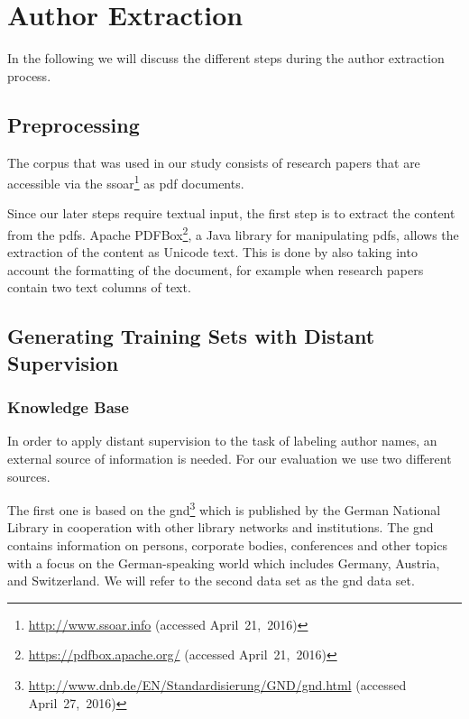 \chapter{Author Extraction}\label{cha:author-extraction}
In the following we will discuss the different steps during the author extraction process.

\section{Preprocessing}\label{sec:ae-preprocessing}

The corpus that was used in our study consists of  research papers that are accessible via the \gls{ssoar}\footnote{\url{http://www.ssoar.info} (accessed April~21,~2016)} as \gls{pdf} documents.

Since our later steps require textual input, the first step is to extract the content from the \glspl{pdf}.
Apache PDFBox\footnote{\url{https://pdfbox.apache.org/} (accessed April~21,~2016)}, a Java library for manipulating \glspl{pdf}, allows the extraction of the content as Unicode text.
This is done by also taking into account the formatting of the document, for example when research papers contain two text columns of text.

\section{Generating Training Sets with Distant Supervision}\label{sec:ae-distant-supervision}

\subsection{Knowledge Base}

In order to apply distant supervision to the task of labeling author names, an external source of information is needed.
For our evaluation we use two different sources.

\bigskip

The first one is based on the \acrfull{gnd}\footnote{\url{http://www.dnb.de/EN/Standardisierung/GND/gnd.html} (accessed April~27,~2016)} which is published by the German National Library in cooperation with other library networks and institutions.
The \gls{gnd} contains information on persons, corporate bodies, conferences and other topics with a focus on the German-speaking world which includes Germany, Austria, and Switzerland.
We will refer to the second data set as the \gls{gnd} data set.

